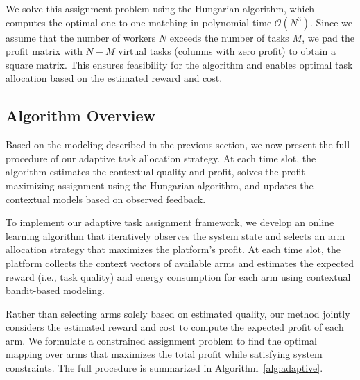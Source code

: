 We solve this assignment problem using the Hungarian algorithm, which computes the optimal one-to-one matching in polynomial time $\mathcal{O}(N^3)$. Since we assume that the number of workers $N$ exceeds the number of tasks $M$, we pad the profit matrix with $N - M$ virtual tasks (columns with zero profit) to obtain a square matrix. This ensures feasibility for the algorithm and enables optimal task allocation based on the estimated reward and cost.





\subsection{Algorithm Overview}

Based on the modeling described in the previous section, we now present the full procedure of our adaptive task allocation strategy. At each time slot, the algorithm estimates the contextual quality and profit, solves the profit-maximizing assignment using the Hungarian algorithm, and updates the contextual models based on observed feedback.

To implement our adaptive task assignment framework, we develop an online learning algorithm that iteratively observes the system state and selects an arm allocation strategy that maximizes the platform’s profit. At each time slot, the platform collects the context vectors of available arms and estimates the expected reward (i.e., task quality) and energy consumption for each arm using contextual bandit-based modeling.

Rather than selecting arms solely based on estimated quality, our method jointly considers the estimated reward and cost to compute the expected profit of each arm. We formulate a constrained assignment problem to find the optimal mapping over arms that maximizes the total profit while satisfying system constraints. The full procedure is summarized in Algorithm~\ref{alg:adaptive}.



